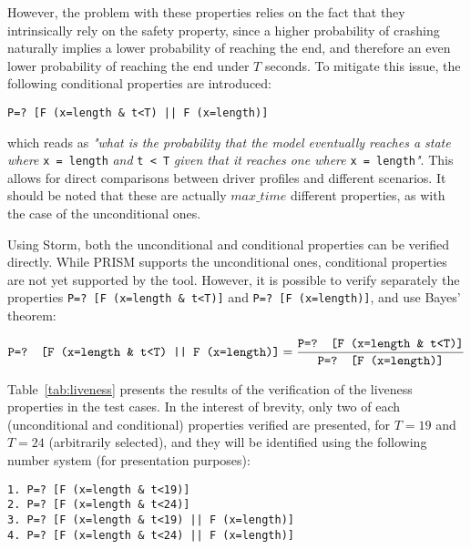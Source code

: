 However, the problem with these properties relies on the fact that they intrinsically rely on the safety property, since a higher probability of crashing naturally implies a lower probability of reaching the end, and therefore an even lower probability of reaching the end under $T$ seconds. To mitigate this issue, the following conditional properties are introduced:

\begin{minipage}{\linewidth}
{\vspace{1em}
\begin{lstlisting}
P=? [F (x=length & t<T) || F (x=length)]
\end{lstlisting}
}
\end{minipage}

which reads as \textit{"what is the probability that the model eventually reaches a state where }\texttt{x = length}\textit{ and }\texttt{t < T}\textit{ given that it reaches one where} \texttt{x = length}\textit{"}. This allows for direct comparisons between driver profiles and different scenarios. It should be noted that these are actually $max\_time$ different properties, as with the case of the unconditional ones. 

Using Storm, both the unconditional and conditional properties can be verified directly. While PRISM supports the unconditional ones, conditional properties are not yet supported by the tool. However, it is possible to verify separately the properties \texttt{P=? [F (x=length \& t<T)]} and \texttt{P=? [F (x=length)]}, and use Bayes' theorem:

\begin{equation}
\text{\texttt{P=? [F (x=length \& t<T) || F (x=length)]}} = \frac{\text{\texttt{P=? [F (x=length \& t<T)]}}}{\text{\texttt{P=? [F (x=length)]}}}
\end{equation}

Table~\ref{tab:liveness} presents the results of the verification of the liveness properties in the test cases. In the interest of brevity, only two of each (unconditional and conditional) properties verified are presented, for $T = 19$ and $T = 24$ (arbitrarily selected), and they will be identified using the following number system (for presentation purposes):

\begin{minipage}{\linewidth}
{\vspace{1em}
\begin{lstlisting}
1. P=? [F (x=length & t<19)]
2. P=? [F (x=length & t<24)]
3. P=? [F (x=length & t<19) || F (x=length)]
4. P=? [F (x=length & t<24) || F (x=length)]
\end{lstlisting}
}
\end{minipage}

